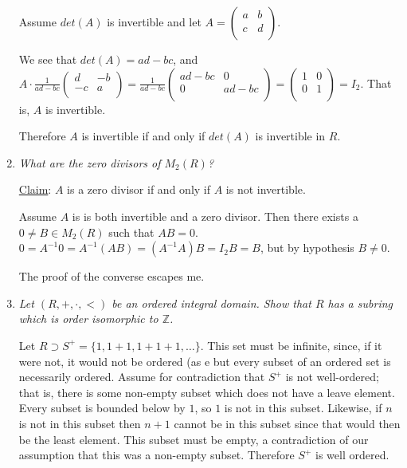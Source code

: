 \documentclass[11pt]{article}
\begin{document}
\begin{enumerate}
Assume $det(A)$ is invertible and let 
$A=\left( \begin{array}{cc} a & b \\ c & d \\ \end{array} \right)$.  

We see that $det(A)=ad-bc$, and $A\cdot\frac{1}{ad-bc}
\left( \begin{array}{rr} d & -b \\ -c & a \\  \end{array} \right) = 
\frac{1}{ad-bc}\left( \begin{array}{cc} ad-bc & 0 \\ 0 & ad-bc \\  \end{array} \right) =
\left( \begin{array}{cc} 1 & 0 \\ 0 & 1 \\  \end{array} \right) = I_2$.  That is, $A$ is invertible.

Therefore $A$ is invertible if and only if $det(A)$ is invertible in $R$.

\item \emph{What are the zero divisors of $M_2(R)$?}

\underline{Claim}: $A$ is a zero divisor if and only if $A$ is not invertible.

Assume $A$ is is both invertible and a zero divisor.  Then there exists a $0 \neq B \in M_2(R)$ such that $AB=0$.
$0 = A^{-1}0 = A^{-1}(AB) = (A^{-1}A)B = I_2B = B$, but by hypothesis $B \neq 0$. 

The proof of the converse escapes me.

\item \emph{Let $(R,+,\cdot,<)$ be an ordered integral domain.  Show that $R$ has a subring which is order isomorphic to $\mathbb{Z}$.}

Let $R \supset S^+=\{1, 1+1, 1+1+1,\ldots\}$.  This set must be infinite, since, if it were not, it would not be ordered (as e but every subset of an ordered set is necessarily ordered.  Assume for contradiction that $S^+$ is not well-ordered; that is, there is some non-empty subset which does not have a leave element.  Every subset is bounded below by $1$, so $1$ is not in this subset.  Likewise, if $n$ is not in this subset then $n+1$ cannot be in this subset since that would then be the least element.  This subset must be empty, a contradiction of our assumption that this was a non-empty subset.  Therefore $S^+$ is well ordered.


\end{enumerate}
\end{document}
